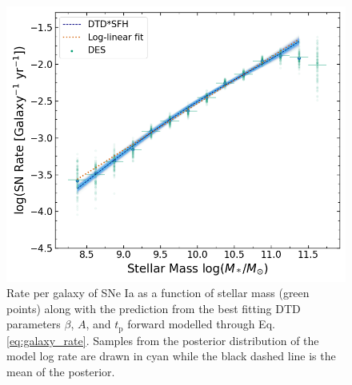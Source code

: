 \documentclass[fleqn,usenatbib]{mnras}
\begin{document}
\begin{figure}
    \centering
    \includegraphics[width=.5\textwidth]{figs/rate_vs_mass_DTD_fit_beta_norm_Qerf1.1.png}
    \caption{Rate per galaxy of SNe Ia as a function of stellar mass (green points) along with the prediction from the best fitting DTD parameters $\beta$, $A$, and $t_{\mathrm{p}}$ forward modelled through Eq. \ref{eq:galaxy_rate}. Samples from the posterior distribution of the model log rate are drawn in cyan while the black dashed line is the mean of the posterior.%
    \label{fig:rate_fitted}}
\end{figure}
\end{document}
